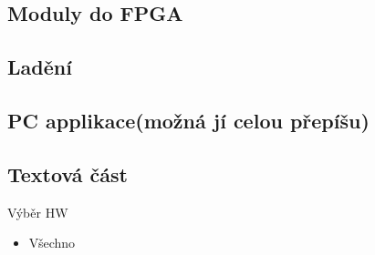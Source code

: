 \documentclass{beamer}
\begin{document}
\subsection{Moduly do FPGA}
\subsection{Ladění}
\subsection{PC applikace(možná jí celou přepíšu)}
\subsection{Textová část}
\begin{frame}{Výběr HW}
	\begin{itemize}
		\item Všechno
		\end{itemize}
	\end{frame}
\end{document}
